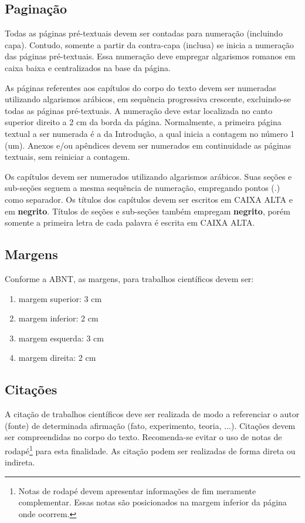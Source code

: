 \subsection{Paginação}

Todas as páginas pré-textuais devem ser contadas para numeração (incluindo capa). Contudo, somente a partir da contra-capa (inclusa) se inicia a numeração das páginas pré-textuais. Essa numeração deve empregar algarismos romanos em caixa baixa e centralizados na base da página.

As páginas referentes aos capítulos do corpo do texto devem ser numeradas utilizando algarismos arábicos, em sequência progressiva crescente, excluindo-se todas as páginas pré-textuais. A numeração deve estar localizada no canto superior direito a 2 cm da borda da página. Normalmente, a primeira página textual a ser numerada é a da Introdução, a qual inicia a contagem no número 1 (um). Anexos e/ou apêndices devem ser numerados em continuidade as páginas textuais, sem reiniciar a contagem.

Os capítulos devem ser numerados utilizando algarismos arábicos. Suas seções e sub-seções seguem a mesma sequência de numeração, empregando pontos (.) como separador. Os títulos dos capítulos devem ser escritos em CAIXA ALTA e em \textbf{negrito}. Títulos de seções e sub-seções também empregam \textbf{negrito}, porém somente a primeira letra de cada palavra é escrita em CAIXA ALTA.

\subsection{Margens}

Conforme a ABNT, as margens, para trabalhos científicos devem ser:
	
\begin{enumerate}[label = {\alph*}) ,itemindent = 0.8 cm]
	\item margem superior: 3 cm
	\item margem inferior: 2 cm
	\item margem esquerda: 3 cm
	\item margem direita: 2 cm
\end{enumerate}

\subsection{Citações}

A citação de trabalhos científicos deve ser realizada de modo a referenciar o autor (fonte) de determinada afirmação (fato, experimento, teoria, ...). Citações devem ser compreendidas no corpo do texto. Recomenda-se evitar o uso de notas de rodapé\footnote{Notas de rodapé devem apresentar informações de fim meramente complementar. Essas notas são posicionados na margem inferior da página onde ocorrem.} para esta finalidade. As citação podem ser realizadas de forma direta ou indireta.

